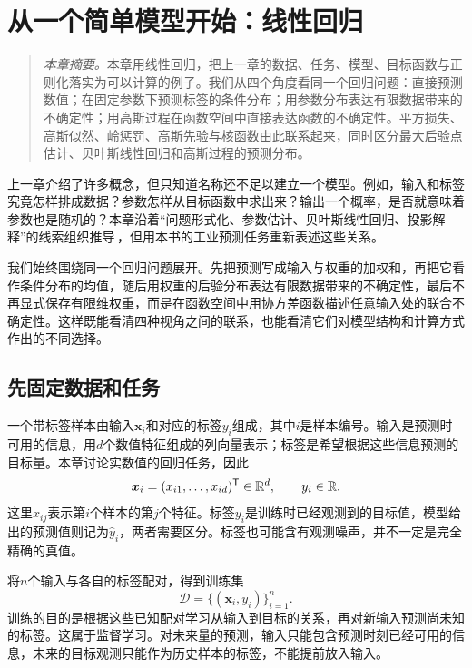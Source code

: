 \chapter{从一个简单模型开始：线性回归}

\begin{quote}\small
\textit{本章摘要。}本章用线性回归，把上一章的数据、任务、模型、目标函数与正则化落实为可以计算的例子。我们从四个角度看同一个回归问题：直接预测数值；在固定参数下预测标签的条件分布；用参数分布表达有限数据带来的不确定性；用高斯过程在函数空间中直接表达函数的不确定性。平方损失、高斯似然、岭惩罚、高斯先验与核函数由此联系起来，同时区分最大后验点估计、贝叶斯线性回归和高斯过程的预测分布。
\end{quote}

上一章介绍了许多概念，但只知道名称还不足以建立一个模型。例如，输入和标签究竟怎样排成数据？参数怎样从目标函数中求出来？输出一个概率，是否就意味着参数也是随机的？本章沿着“问题形式化、参数估计、贝叶斯线性回归、投影解释”的线索组织推导\,\cite{deisenroth2020mml}，但用本书的工业预测任务重新表述这些关系。

我们始终围绕同一个回归问题展开。先把预测写成输入与权重的加权和，再把它看作条件分布的均值，随后用权重的后验分布表达有限数据带来的不确定性，最后不再显式保存有限维权重，而是在函数空间中用协方差函数描述任意输入处的联合不确定性。这样既能看清四种视角之间的联系，也能看清它们对模型结构和计算方式作出的不同选择。

\section{先固定数据和任务}
一个带标签样本由输入$\bm x_i$和对应的标签$y_i$组成，其中$i$是样本编号。输入是预测时可用的信息，用$d$个数值特征组成的列向量表示；标签是希望根据这些信息预测的目标量。本章讨论实数值的回归任务，因此
\begin{equation}
 \bm x_i=(x_{i1},\ldots,x_{id})^{\mathsf T}\in\mathbb{R}^d,
 \qquad y_i\in\mathbb{R}.
\end{equation}
这里$x_{ij}$表示第$i$个样本的第$j$个特征。标签$y_i$是训练时已经观测到的目标值，模型给出的预测值则记为$\hat y_i$，两者需要区分。标签也可能含有观测噪声，并不一定是完全精确的真值。

将$n$个输入与各自的标签配对，得到训练集
\begin{equation}
 \mathcal D=\{(\bm x_i,y_i)\}_{i=1}^n.
\end{equation}
训练的目的是根据这些已知配对学习从输入到目标的关系，再对新输入预测尚未知的标签。这属于监督学习。对未来量的预测，输入只能包含预测时刻已经可用的信息，未来的目标观测只能作为历史样本的标签，不能提前放入输入。


